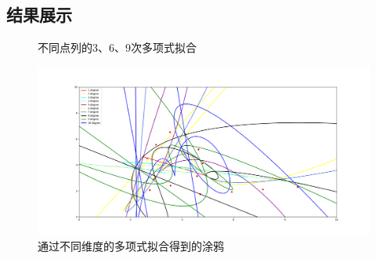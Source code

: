 \documentclass{article}
\begin{document}
    \subsection{结果展示}
    \begin{figure}[htbp]
    	\centering
    	\caption{不同点列的3、6、9次多项式拟合} %
    	\label{fig:1}  %
    \end{figure}
    
    \begin{figure}[htbp]
    	\centering %
    	\includegraphics[scale=0.3]{tuya.png}
    	\caption{通过不同维度的多项式拟合得到的涂鸦}
    \end{figure}
\end{document}
